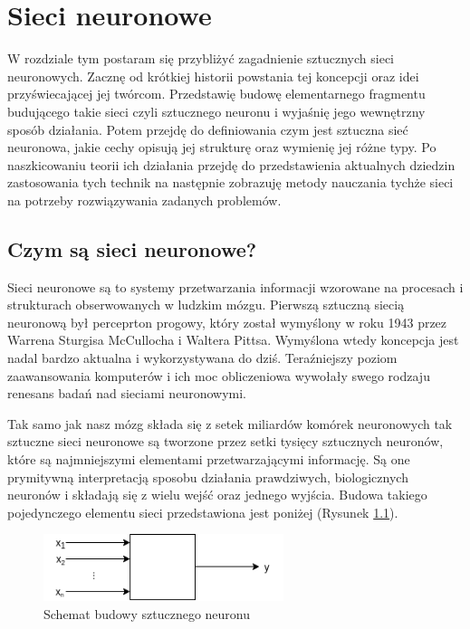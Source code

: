 \documentclass[12pt, oneside, a4paper]{report}
\begin{document}
\chapter{Sieci neuronowe}

W rozdziale tym postaram się przybliżyć zagadnienie sztucznych sieci neuronowych. Zacznę od krótkiej historii powstania tej koncepcji oraz idei przyświecającej jej twórcom. Przedstawię budowę elementarnego fragmentu budującego takie sieci czyli sztucznego neuronu i wyjaśnię jego wewnętrzny sposób działania. Potem przejdę do definiowania czym jest sztuczna sieć neuronowa, jakie cechy opisują jej strukturę oraz wymienię jej różne typy. Po naszkicowaniu teorii ich działania przejdę do przedstawienia aktualnych dziedzin zastosowania tych technik na następnie zobrazuję metody nauczania tychże sieci na potrzeby rozwiązywania zadanych problemów.

\section{Czym są sieci neuronowe?}

Sieci neuronowe są to systemy przetwarzania informacji wzorowane na procesach i strukturach obserwowanych w ludzkim mózgu. Pierwszą sztuczną siecią neuronową był perceprton progowy, który został wymyślony w roku 1943 przez Warrena Sturgisa McCullocha i Waltera Pittsa. Wymyślona wtedy koncepcja jest nadal bardzo aktualna i wykorzystywana do dziś. Teraźniejszy poziom zaawansowania komputerów i ich moc obliczeniowa wywołały swego rodzaju renesans badań nad sieciami neuronowymi.

Tak samo jak nasz mózg składa się z setek miliardów komórek neuronowych tak sztuczne sieci neuronowe są tworzone przez setki tysięcy sztucznych neuronów, które są najmniejszymi elementami przetwarzającymi informację. Są one prymitywną interpretacją sposobu działania prawdziwych, biologicznych neuronów i składają się z wielu wejść oraz jednego wyjścia. Budowa takiego pojedynczego elementu sieci przedstawiona jest poniżej (Rysunek \ref{fig: 2.1}).

\begin{figure}[h]
	\centering
	\includegraphics[width=7cm]{fig211.png}
	\caption{Schemat budowy sztucznego neuronu}
	\label{fig: 2.1}
\end{figure}
\end{document}
